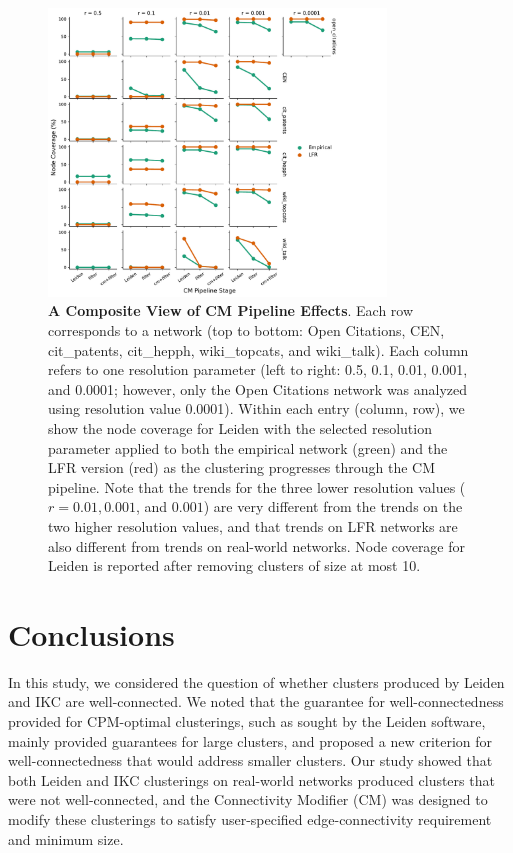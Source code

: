 \documentclass[11pt]{article}   	%
\begin{document}
\begin{figure}[h!]
\centering
\includegraphics[width=0.8\textwidth]{figs/cm_stats_trimmed.pdf}
\caption{\textbf{A Composite View of CM Pipeline Effects}. Each row corresponds to a network (top to bottom: Open Citations, CEN, cit\_patents, cit\_hepph, wiki\_topcats, and wiki\_talk). Each column refers to one resolution parameter (left to right: 0.5, 0.1, 0.01, 0.001, and 0.0001; however, only the Open Citations network was analyzed using resolution value 0.0001).
Within each entry (column, row), we show the node coverage for Leiden with the selected resolution parameter applied to both the empirical network (green) and the LFR version (red) as the clustering progresses through the CM pipeline. Note that the trends for the three lower resolution values ($r=0.01, 0.001$, and $0.001$) are very different from the trends on the two higher resolution values, and that trends on LFR networks are also different from trends on real-world networks.
Node coverage for Leiden is reported after removing clusters of size at most 10.}
\label{fig:composite-view}
\end{figure}



\section{Conclusions}
In this study, we considered the question of whether clusters produced by Leiden and IKC are well-connected. We noted that the guarantee for well-connectedness provided for CPM-optimal clusterings, such as sought by the Leiden software, mainly provided guarantees for large clusters, and proposed a new criterion for well-connectedness that would address smaller clusters. Our study showed that both Leiden and IKC clusterings on real-world networks produced clusters that were not well-connected, and the Connectivity Modifier (CM) was designed to modify these clusterings to satisfy user-specified edge-connectivity requirement and minimum size.
\end{document}
